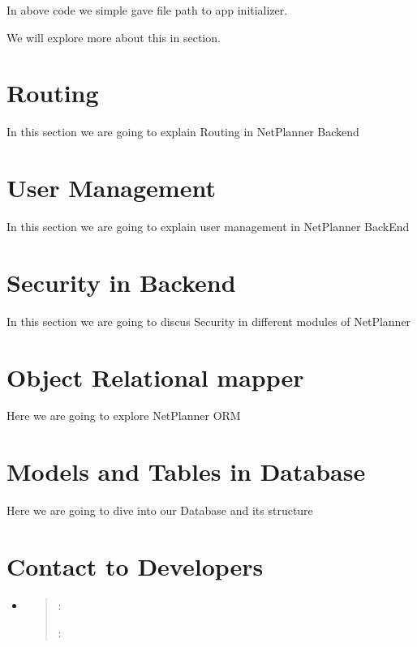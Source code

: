 \documentclass[letterpaper,10pt,english]{sphinxmanual}
\begin{document}
In above code we simple gave  file path to app initializer.

We will explore more about this in  section.


\section{Routing}
\label{\detokenize{Routing:routing}}\label{\detokenize{Routing::doc}}
In this section we are going to explain Routing in NetPlanner Backend


\section{User Management}
\label{\detokenize{UserManagement:user-management}}\label{\detokenize{UserManagement::doc}}
In this section we are going to explain user management in NetPlanner BackEnd


\section{Security in Backend}
\label{\detokenize{Security:security-in-backend}}\label{\detokenize{Security::doc}}
In this section we are going to discus Security in different modules of NetPlanner


\section{Object Relational mapper}
\label{\detokenize{ORM:object-relational-mapper}}\label{\detokenize{ORM::doc}}
Here we are going to explore NetPlanner ORM


\section{Models and Tables in Database}
\label{\detokenize{Models:models-and-tables-in-database}}\label{\detokenize{Models::doc}}
Here we are going to dive into our Database and its structure


\section{Contact to Developers}
\label{\detokenize{Contact:contact-to-developers}}\label{\detokenize{Contact::doc}}\begin{itemize}
\item {} 
\begin{quote}

: 

: 
\end{quote}

\end{itemize}



\renewcommand{\indexname}{Index}
\printindex
\end{document}
